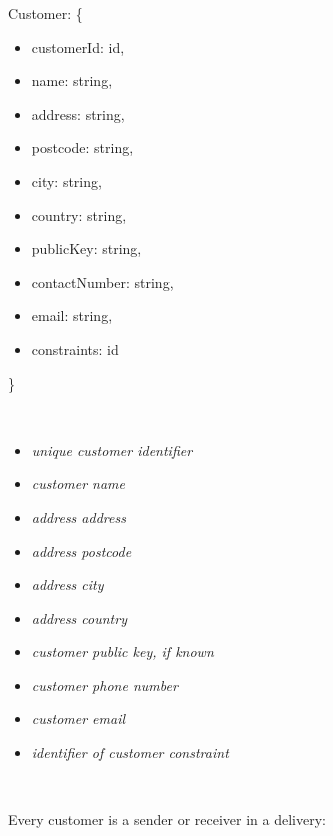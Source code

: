 \begin{minipage}{6.5cm}
    Customer: \{
    \begin{itemize} 
        \itemsep-0.5em
        \item[] customerId: id,
        \item[] name: string,
        \item[] address: string,
        \item[] postcode: string,
        \item[] city: string,
        \item[] country: string,
        \item[] publicKey: string,
        \item[] contactNumber: string,
        \item[] email: string,
        \item[] constraints: id
    \end{itemize}
    \}
\end{minipage}
\begin{minipage}{10cm}
    \hspace{1cm} \\
    \begin{itemize}
        \itemsep-0.5em
        \item[] \textit{unique customer identifier}
        \item[] \textit{customer name}
        \item[] \textit{address address}
        \item[] \textit{address postcode}
        \item[] \textit {address city}
        \item[] \textit{address country}
        \item[] \textit{customer public key, if known}
        \item[] \textit{customer phone number}
        \item[] \textit{customer email}
        \item[] \textit{identifier of customer constraint}
    \end{itemize}
    \hspace{1cm} \\
\end{minipage}

Every customer is a sender or receiver in a delivery: 

